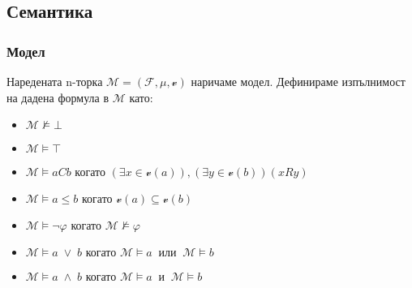 \documentclass{beamer}
\begin{document}
\subsection{Семантика}
\begin{frame}\frametitle{Модел}
	Наредената n-торка $\mathcal{M} = (\mathcal{F}, \mu, \mathscr{v})$ наричаме модел. Дефинираме изпълнимост на дадена формула в $\mathcal{M}$ като:
		\begin{itemize}
			\item $\mathcal{M} \not\models \bot$ 
			\item $\mathcal{M} \models \top$
			\item $\mathcal{M} \models aCb \text{ когато } (\exists x \in \mathscr{v}(a)), (\exists y \in \mathscr{v}(b)) (xRy)$
			\item $\mathcal{M} \models a \leq b \text{ когато } \mathscr{v}(a) \subseteq \mathscr{v}(b)$
			\item $\mathcal{M} \models \neg \varphi \text{ когато } \mathcal{M} \not\models \varphi$
			\item $\mathcal{M} \models a \; \vee \; b \text{ когато } \mathcal{M} \models a \: \textit{ или } \: \mathcal{M} \models b$
			\item $\mathcal{M} \models a \; \wedge \; b \text{ когато } \mathcal{M} \models a \: \textit{ и } \: \mathcal{M} \models b$
		\end{itemize}
	
\end{frame}
\end{document}
